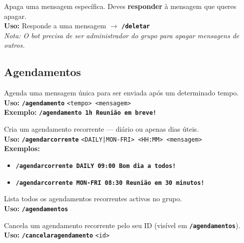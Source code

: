 \documentclass[12pt,a4paper]{article}
\newcommand{\cmd}[1]{\texttt{\textcolor{orbisblue}{\textbf{#1}}}}
\newcommand{\param}[1]{\texttt{\textcolor{orbisMid}{#1}}}
\begin{document}
\begin{tcolorbox}[cmdbox, title={\faTrash\ /deletar}]
Apaga uma mensagem específica. Deves \textbf{responder} à mensagem que queres apagar.\\
\textbf{Uso:} Responde a uma mensagem $\to$ \cmd{/deletar}\\
\textit{Nota: O bot precisa de ser administrador do grupo para apagar mensagens de outros.}
\end{tcolorbox}

\subsection{Agendamentos}

\begin{tcolorbox}[cmdbox, title={\faClock\ /agendamento}]
Agenda uma mensagem única para ser enviada após um determinado tempo.\\
\textbf{Uso:} \cmd{/agendamento} \param{<tempo> <mensagem>}\\
\textbf{Exemplo:} \cmd{/agendamento 1h Reunião em breve!}
\end{tcolorbox}

\begin{tcolorbox}[cmdbox, title={\faClock\ /agendarcorrente}]
Cria um agendamento recorrente — diário ou apenas dias úteis.\\
\textbf{Uso:} \cmd{/agendarcorrente} \param{<DAILY|MON-FRI> <HH:MM> <mensagem>}\\
\textbf{Exemplos:}
\begin{itemize}[leftmargin=1.2em, itemsep=1pt]
  \item \cmd{/agendarcorrente DAILY 09:00 Bom dia a todos!}
  \item \cmd{/agendarcorrente MON-FRI 08:30 Reunião em 30 minutos!}
\end{itemize}
\end{tcolorbox}

\begin{tcolorbox}[cmdbox, title={\faListAlt\ /agendamentos}]
Lista todos os agendamentos recorrentes activos no grupo.\\
\textbf{Uso:} \cmd{/agendamentos}
\end{tcolorbox}

\begin{tcolorbox}[cmdbox, title={\faTimes\ /cancelaragendamento}]
Cancela um agendamento recorrente pelo seu ID (visível em \cmd{/agendamentos}).\\
\textbf{Uso:} \cmd{/cancelaragendamento} \param{<id>}
\end{tcolorbox}
\end{document}
